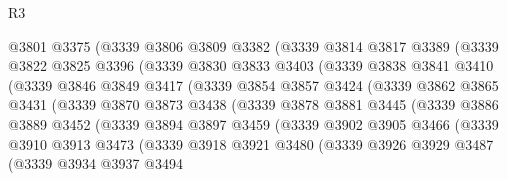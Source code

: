 \begin{lexlean}{R3}
\begin{coremodule}
              @3801
              @3375
              (@3339
                @3806
                @3809
                @3382
                (@3339
                  @3814
                  @3817
                  @3389
                  (@3339
                    @3822
                    @3825
                    @3396
                    (@3339
                      @3830
                      @3833
                      @3403
                      (@3339
                        @3838
                        @3841
                        @3410
                        (@3339
                          @3846
                          @3849
                          @3417
                          (@3339
                            @3854
                            @3857
                            @3424
                            (@3339
                              @3862
                              @3865
                              @3431
                              (@3339
                                @3870
                                @3873
                                @3438
                                (@3339
                                  @3878
                                  @3881
                                  @3445
                                  (@3339
                                    @3886
                                    @3889
                                    @3452
                                    (@3339
                                      @3894
                                      @3897
                                      @3459
                                      (@3339
                                        @3902
                                        @3905
                                        @3466
                                        (@3339
                                          @3910
                                          @3913
                                          @3473
                                          (@3339
                                            @3918
                                            @3921
                                            @3480
                                            (@3339
                                              @3926
                                              @3929
                                              @3487
                                              (@3339
                                                @3934
                                                @3937
                                                @3494

\end{coremodule}
\end{lexlean}
